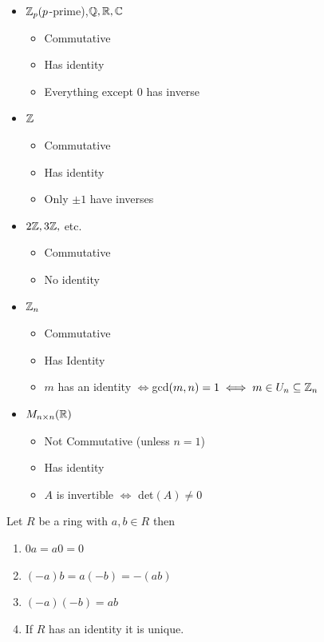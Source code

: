 \begin{example}
    \phantom{text}

    \begin{itemize}
        \item $\mathbb{Z}_p(p$-prime),$\mathbb{Q},\mathbb{R},\mathbb{C}$
        \begin{itemize}
            \item Commutative 
            \item Has identity
            \item Everything except $0$ has inverse
        \end{itemize}
        \item $\mathbb{Z}$
        \begin{itemize}
            \item Commutative 
            \item Has identity
            \item Only $\pm 1$ have inverses
        \end{itemize}
        \item $2\mathbb{Z},3\mathbb{Z},$ etc.
        \begin{itemize}
            \item Commutative
            \item No identity
        \end{itemize}
        \item $\mathbb{Z}_n$
        \begin{itemize}
            \item Commutative
            \item Has Identity
            \item $m$ has an identity
            $\iff$gcd$(m,n)=1 \iff m \in U_n \subseteq \mathbb{Z}_n$
        \end{itemize}
        \item $M_{n\times n}(\mathbb{R})$
        \begin{itemize}
            \item Not Commutative (unless $n=1$)
            \item Has identity
            \item $A$ is invertible $\iff$ det$(A)\neq 0$
        \end{itemize}
    \end{itemize}
\end{example}

\begin{proposition}
    Let $R$ be a ring with $a,b\in R$ then
    \begin{enumerate}
        \item $0a=a0=0$
        \item $(-a)b=a(-b)=-(ab)$
        \item $(-a)(-b)=ab$
        \item If $R$ has an identity it is unique.
    \end{enumerate}
\end{proposition}

